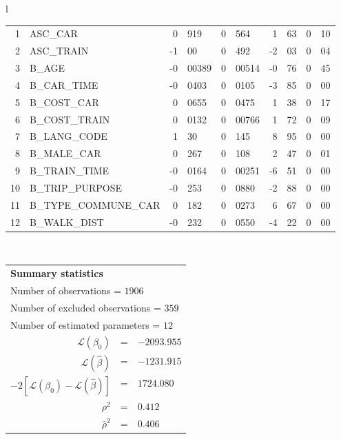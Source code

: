 \begin{tabular}{l}
\begin{tabular}{rlr@{.}lr@{.}lr@{.}lr@{.}l}
1 & ASC_CAR & 0&919 & 0&564 & 1&63 & 0&10\\
2 & ASC_TRAIN & -1&00 & 0&492 & -2&03 & 0&04\\
3 & B_AGE & -0&00389 & 0&00514 & -0&76 & 0&45\\
4 & B_CAR_TIME & -0&0403 & 0&0105 & -3&85 & 0&00\\
5 & B_COST_CAR & 0&0655 & 0&0475 & 1&38 & 0&17\\
6 & B_COST_TRAIN & 0&0132 & 0&00766 & 1&72 & 0&09\\
7 & B_LANG_CODE & 1&30 & 0&145 & 8&95 & 0&00\\
8 & B_MALE_CAR & 0&267 & 0&108 & 2&47 & 0&01\\
9 & B_TRAIN_TIME & -0&0164 & 0&00251 & -6&51 & 0&00\\
10 & B_TRIP_PURPOSE & -0&253 & 0&0880 & -2&88 & 0&00\\
11 & B_TYPE_COMMUNE_CAR & 0&182 & 0&0273 & 6&67 & 0&00\\
12 & B_WALK_DIST & -0&232 & 0&0550 & -4&22 & 0&00\\
\hline
\end{tabular}
\\
\begin{tabular}{rcl}
\multicolumn{3}{l}{\bf Summary statistics}\\
\multicolumn{3}{l}{ Number of observations = $1906$} \\
\multicolumn{3}{l}{ Number of excluded observations = $359$} \\
\multicolumn{3}{l}{ Number of estimated  parameters = $12$} \\
 $\mathcal{L}(\beta_0)$ &=&  $-2093.955$ \\
 $\mathcal{L}(\hat{\beta})$ &=& $-1231.915 $  \\
 $-2[\mathcal{L}(\beta_0) -\mathcal{L}(\hat{\beta})]$ &=& $1724.080$ \\
    $\rho^2$ &=&   $0.412$ \\
    $\bar{\rho}^2$ &=&    $0.406$ \\
\end{tabular}
  \end{tabular}
